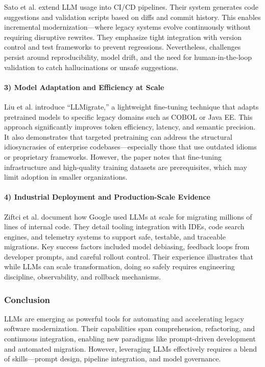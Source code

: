 \documentclass[12pt]{article}
\begin{document}
Sato et al. \cite{sato2024} extend LLM usage into CI/CD pipelines. Their system generates code suggestions and validation scripts based on diffs and commit history. This enables incremental modernization—where legacy systems evolve continuously without requiring disruptive rewrites. They emphasize tight integration with version control and test frameworks to prevent regressions. Nevertheless, challenges persist around reproducibility, model drift, and the need for human-in-the-loop validation to catch hallucinations or unsafe suggestions.

\paragraph{3) Model Adaptation and Efficiency at Scale}

Liu et al. \cite{llmigrate2025} introduce “LLMigrate,” a lightweight fine-tuning technique that adapts pretrained models to specific legacy domains such as COBOL or Java EE. This approach significantly improves token efficiency, latency, and semantic precision. It also demonstrates that targeted pretraining can address the structural idiosyncrasies of enterprise codebases—especially those that use outdated idioms or proprietary frameworks. However, the paper notes that fine-tuning infrastructure and high-quality training datasets are prerequisites, which may limit adoption in smaller organizations.

\paragraph{4) Industrial Deployment and Production-Scale Evidence}

Ziftci et al. \cite{googlemigrate2025} document how Google used LLMs at scale for migrating millions of lines of internal code. They detail tooling integration with IDEs, code search engines, and telemetry systems to support safe, testable, and traceable migrations. Key success factors included model debiasing, feedback loops from developer prompts, and careful rollout control. Their experience illustrates that while LLMs can scale transformation, doing so safely requires engineering discipline, observability, and rollback mechanisms.

\subsubsection{Conclusion}

LLMs are emerging as powerful tools for automating and accelerating legacy software modernization. Their capabilities span comprehension, refactoring, and continuous integration, enabling new paradigms like prompt-driven development and automated migration. However, leveraging LLMs effectively requires a blend of skills—prompt design, pipeline integration, and model governance.
\end{document}
